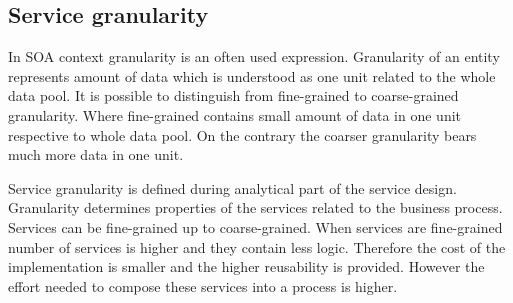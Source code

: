 


\bigskip



\subsection{Service granularity}
\label{sec:granularity}
In SOA context granularity is an often used expression. Granularity of an entity represents amount of data which is understood as one unit related to the whole data pool. It is possible to distinguish from fine-grained to coarse-grained granularity. Where fine-grained contains small amount of data in one unit respective to whole data pool. On the contrary the coarser granularity bears much more data in one unit.

Service granularity is defined during analytical part of the service design. Granularity determines properties of the services related to the business process. Services can be fine-grained up to coarse-grained. When services are fine-grained number of services is higher and they contain less logic. Therefore the cost of the implementation is smaller and the higher reusability is provided. However the effort needed to compose these services into a process is higher. 

